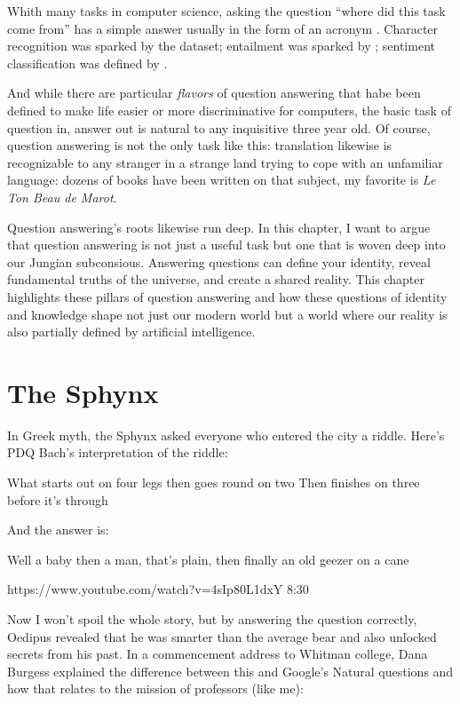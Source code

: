 

Whith many tasks in computer science, asking the question ``where did this task come from'' has a simple answer usually in the form of an acronym . 
%
Character recognition was sparked by the  dataset; entailment was sparked by ; sentiment classification was defined by \citet{}.

And while there are particular \emph{flavors} of question answering that habe been defined to make life easier or more discriminative for computers, the basic task of question in, answer out is natural to any inquisitive three year old.
%
Of course, question answering is not the only task like this: translation likewise is recognizable to any stranger in a strange land trying to cope with an unfamiliar language: dozens of books have been written on that subject, my favorite is \textit{Le Ton Beau de Marot}.

Question answering's roots likewise run deep.  In this chapter, I want to argue that question answering is not just a useful task but one that is woven deep into our Jungian subconsious.
%
Answering questions can define your identity, reveal fundamental truths of the universe, and create a shared reality.
%
This chapter highlights these pillars of question answering and how these questions of identity and knowledge shape not just our modern world but a world where our reality is also partially defined by artificial intelligence.

\section{The Sphynx}



In Greek myth, the Sphynx asked everyone who entered the city a riddle.  Here’s PDQ Bach’s interpretation of the riddle:

What starts out on four legs then goes round on two
Then finishes on three before it’s through

And the answer is:

Well a baby then a man, that’s plain, 
then finally an old geezer on a cane

https://www.youtube.com/watch?v=4sIp80L1dxY 8:30

Now I won’t spoil the whole story, but by answering the question correctly, Oedipus revealed that he was smarter than the average bear and also unlocked secrets from his past.  In a commencement address to Whitman college, Dana Burgess explained the difference between this and Google’s Natural questions and how that relates to the mission of professors (like me):

